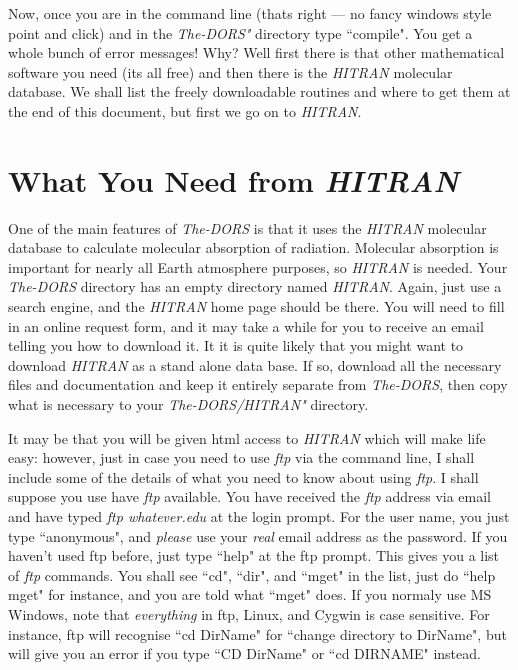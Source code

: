 \documentclass[12pt]{article}
\begin{document}
Now, once you are in the command line (thats right --- no fancy
 windows style point and click) and in the {\it The-DORS"} directory type ``compile". You get a whole bunch of
error messages! Why? Well first there is that other mathematical software you need (its all free) 
and then there is the {\it HITRAN} molecular database. We shall list the
freely downloadable routines and where to get them at the end of this document,
but first we go on to {\it HITRAN}.

\section{What You Need from {\it HITRAN}}


One of the main features of  {\it The-DORS} is that it uses the 
{\it HITRAN} \cite{RothmanETAL:Mybib} molecular database to calculate molecular absorption of radiation.
Molecular absorption is important for nearly all Earth
atmosphere purposes, so {\it HITRAN} is needed. Your {\it The-DORS} directory has an empty directory
named {\it HITRAN}.
 Again, just use a search engine, and the {\it HITRAN} home page
should be there. You will need to fill in an online request form, and it may take a while for
you to receive an email telling you how to download it. It it is quite likely that you might want to 
download {\it HITRAN} as a stand alone data base. If so, download all the necessary files
and documentation and keep it entirely separate from {\it The-DORS}, then copy what is
necessary to your {\it The-DORS/HITRAN"} directory.

It may be that you will be given html access to {\it HITRAN} which will make life easy: however, just in case you need
to use {\it ftp} via the command line, I shall include some of the details  of what you need to know 
about using {\it ftp}.
I shall suppose you use have {\it ftp} available. 
You have received
 the {\it ftp} address via email and have typed {\it ftp whatever.edu} 
at the login prompt. 
For the user name, you just type ``anonymous", and {\it please} use your {\it real}
 email address as the password. If you haven't used ftp before, just type ``help" at the ftp prompt.
This gives you a list of {\it ftp} commands. 
You shall see ``cd", ``dir", and ``mget" in the list, just do ``help mget" for instance, and you are told
what ``mget" does.  If you normaly use MS Windows, note 
that {\it everything} in ftp, Linux,  and Cygwin is case sensitive. 
For instance, ftp will recognise 	``cd DirName" for ``change directory to
 DirName", but
will give you an error if you type ``CD DirName" or ``cd DIRNAME" instead. 
\end{document}
